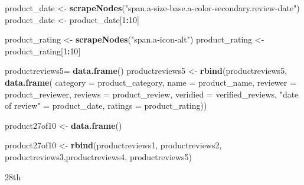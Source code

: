 \documentclass[
]{article}
\newenvironment{Shaded}{\begin{snugshade}}{\end{snugshade}}
\newcommand{\AttributeTok}[1]{\textcolor[rgb]{0.13,0.29,0.53}{#1}}
\newcommand{\DecValTok}[1]{\textcolor[rgb]{0.00,0.00,0.81}{#1}}
\newcommand{\FunctionTok}[1]{\textcolor[rgb]{0.13,0.29,0.53}{\textbf{#1}}}
\newcommand{\NormalTok}[1]{#1}
\newcommand{\OtherTok}[1]{\textcolor[rgb]{0.56,0.35,0.01}{#1}}
\newcommand{\SpecialCharTok}[1]{\textcolor[rgb]{0.81,0.36,0.00}{\textbf{#1}}}
\newcommand{\StringTok}[1]{\textcolor[rgb]{0.31,0.60,0.02}{#1}}
\begin{document}
\begin{Shaded}
\begin{Highlighting}[]
\NormalTok{  product\_date }\OtherTok{\textless{}{-}} \FunctionTok{scrapeNodes}\NormalTok{(}\StringTok{"span.a{-}size{-}base.a{-}color{-}secondary.review{-}date"}\NormalTok{)}
\NormalTok{  product\_date }\OtherTok{\textless{}{-}}\NormalTok{ product\_date[}\DecValTok{1}\SpecialCharTok{:}\DecValTok{10}\NormalTok{]}
  
\NormalTok{  product\_rating }\OtherTok{\textless{}{-}} \FunctionTok{scrapeNodes}\NormalTok{(}\StringTok{"span.a{-}icon{-}alt"}\NormalTok{)}
\NormalTok{  product\_rating }\OtherTok{\textless{}{-}}\NormalTok{ product\_rating[}\DecValTok{1}\SpecialCharTok{:}\DecValTok{10}\NormalTok{]}
  
\NormalTok{  productreviews5}\OtherTok{=} \FunctionTok{data.frame}\NormalTok{()}
\NormalTok{  productreviews5 }\OtherTok{\textless{}{-}} \FunctionTok{rbind}\NormalTok{(productreviews5, }\FunctionTok{data.frame}\NormalTok{(}
                      \AttributeTok{category =}\NormalTok{ product\_category,}
                      \AttributeTok{name =}\NormalTok{ product\_name,}
                      \AttributeTok{reviewer =}\NormalTok{ product\_reviewer,}
                      \AttributeTok{reviews =}\NormalTok{ product\_review,}
                      \AttributeTok{veridied =}\NormalTok{ verified\_reviews,}
                      \StringTok{"date of review"} \OtherTok{=}\NormalTok{ product\_date,}
                      \AttributeTok{ratings =}\NormalTok{ product\_rating))}
  
\NormalTok{  product27of10 }\OtherTok{\textless{}{-}} \FunctionTok{data.frame}\NormalTok{()}
  
\NormalTok{  product27of10 }\OtherTok{\textless{}{-}} \FunctionTok{rbind}\NormalTok{(productreviews1, productreviews2, productreviews3,productreviews4, productreviews5)}
\end{Highlighting}
\end{Shaded}

28th
\end{document}
